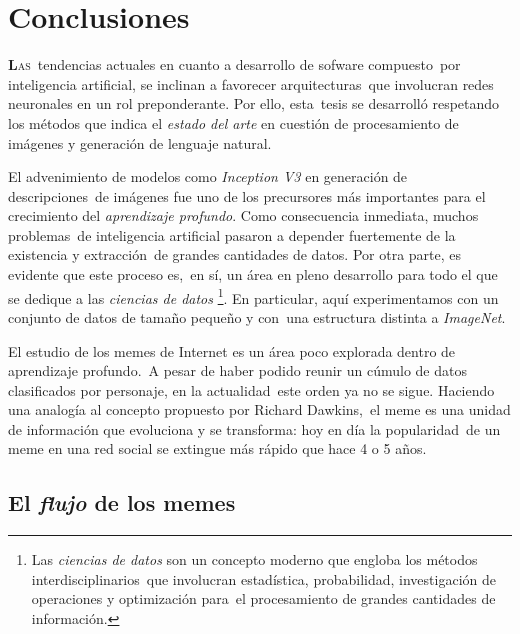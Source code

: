 \chapter{Conclusiones}

\noindent
\lettrine[lines=2, lhang=0.33, loversize=0.25]{\textbf{L}}{as}\
tendencias actuales en cuanto a desarrollo de sofware compuesto\
por inteligencia artificial, se inclinan a favorecer arquitecturas\
que involucran redes neuronales en un rol preponderante. Por ello, esta\
tesis se desarrolló respetando los métodos que indica el \emph{estado del arte}
en cuestión de procesamiento de imágenes y generación de lenguaje natural.\par
El advenimiento de modelos como \emph{Inception V3} en generación de descripciones\
de imágenes fue uno de los precursores más importantes para el crecimiento
del \emph{aprendizaje profundo}. Como consecuencia inmediata, muchos problemas\
de inteligencia artificial pasaron a depender fuertemente de la existencia y extracción\
de grandes cantidades de datos. Por otra parte, es evidente que este proceso es,\
en sí, un área en pleno desarrollo para todo el que se dedique a las \emph{ciencias de datos}%
\footnote{
  Las \emph{ciencias de datos} son un concepto moderno que engloba los métodos interdisciplinarios\
  que involucran estadística, probabilidad, investigación de operaciones y optimización para\
  el procesamiento de grandes cantidades de información.
}. En particular, aquí experimentamos con un conjunto de datos de tamaño pequeño y con\
una estructura distinta a \emph{ImageNet}.\par
El estudio de los memes de Internet es un área poco explorada dentro de aprendizaje profundo.\
A pesar de haber podido reunir un cúmulo de datos clasificados por personaje, en la actualidad\
este orden ya no se sigue. Haciendo una analogía al concepto propuesto por Richard Dawkins,\
el meme es una unidad de información que evoluciona y se transforma: hoy en día la popularidad\
de un meme en una red social se extingue más rápido que hace 4 o 5 años.

\section{El \emph{flujo} de los memes}

